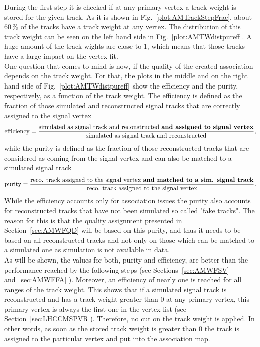 During the first step it is checked if at any primary vertex a track weight is stored for the given track.  As it is shown in Fig.~\ref{plot:AMTrackStepFrac}, about $60\,\%$ of the tracks have a track weight at any vertex. The distribution of this track weight can be seen on the left hand side in Fig.~\ref{plot:AMTWdistpureff}. A huge amount of the track wights are close to 1, which means that those tracks have a large impact on the vertex fit.\\
One question that comes to mind is now, if the quality of the created association depends on the track weight. For that, the plots in the middle and on the right hand side of Fig.~\ref{plot:AMTWdistpureff} show the efficiency and the purity, respectively, as a function of the track weight. The efficiency is defined as the fraction of those simulated and reconstructed signal tracks that are correctly assigned to the signal vertex
\begin{equation}
    \textrm{efficiency} = \frac{\textrm{simulated as signal track and reconstructed \textbf{and assigned to signal vertex}}}{\textrm{simulated as signal track and reconstructed}},
    \label{eq:Efficiency}
\end{equation}
while the purity is defined as the fraction of those reconstructed tracks that are considered as coming from the signal vertex and can also be matched to a simulated signal track
\begin{equation}
    \textrm{purity} = \frac{\textrm{reco. track assigned to the signal vertex \textbf{and matched to a sim. signal track}}}{\textrm{reco. track assigned to the signal vertex}}.
    \label{eq:Purity}
\end{equation}
While the efficiency accounts only for association issues the purity also accounts for reconstructed tracks that have not been simulated so called "fake tracks". The reason for this is that the quality assignment presented in Section~\ref{sec:AMWFQD} will be based on this purity, and thus it needs to be based on all reconstructed tracks and not only on those which can be matched to a simulated one as simulation is not available in data. \\
As will be shown, the values for both, purity and efficiency, are better than the performance reached by the following steps (see Sections~\ref{sec:AMWFSV} and~\ref{sec:AMWFFA} ). Moreover, an efficiency of nearly one is reached for all ranges of the track weight. This shows that if a simulated signal track is reconstructed and has a track weight greater than 0 at any primary vertex, this primary vertex is always the first one in the vertex list (see Section~\ref{sec:LHCCMSPVR}). Therefore, no cut on the track weight is applied. In other words, as soon as the stored track weight is greater than 0 the track is assigned to the particular vertex and put into the association map.

